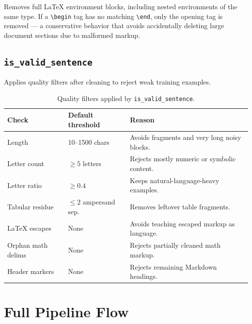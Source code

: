 \documentclass[12pt,a4paper]{article}
\begin{document}
Removes full LaTeX environment blocks, including nested environments of the same type. If a \texttt{\textbackslash begin} tag has no matching \texttt{\textbackslash end}, only the opening tag is removed — a conservative behavior that avoids accidentally deleting large document sections due to malformed markup.

\subsection{\texttt{is\_valid\_sentence}}

Applies quality filters after cleaning to reject weak training examples.

\begin{table}[H]
\centering
\caption{Quality filters applied by \texttt{is\_valid\_sentence}.}
\label{tab:valid-sent}
\renewcommand{\arraystretch}{1.25}
\begin{tabularx}{\linewidth}{llX}
\toprule
\textbf{Check} & \textbf{Default threshold} & \textbf{Reason} \\
\midrule
Length               & 10–1500 chars              & Avoids fragments and very long noisy blocks. \\
Letter count         & $\geq 5$ letters           & Rejects mostly numeric or symbolic content. \\
Letter ratio         & $\geq 0.4$                 & Keeps natural-language-heavy examples. \\
Tabular residue      & $\leq 2$ ampersand sep.    & Removes leftover table fragments. \\
LaTeX escapes        & None                       & Avoids teaching escaped markup as language. \\
Orphan math delims   & None                       & Rejects partially cleaned math markup. \\
Header markers       & None                       & Rejects remaining Markdown headings. \\
\bottomrule
\end{tabularx}
\end{table}

\section{Full Pipeline Flow}
\end{document}
